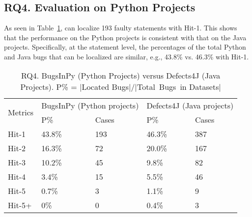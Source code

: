 \subsection{\bf RQ4. Evaluation on Python Projects}
As seen in Table~\ref{RQ4}, {\tool} can localize 193 faulty
statements with Hit-1. This shows that the
performance on the Python projects is consistent with that
on the Java projects. Specifically, at the statement level, the
percentages of the total Python and Java bugs that can be localized
are similar, e.g., 43.8\% vs. 46.3\% with Hit-1.



\begin{table}[t]
  \caption{RQ4. BugsInPy (Python Projects) versus Defects4J (Java Projects). P\% = $|$Located Bugs$|$/$|$Total~Bugs~in Datasets$|$}
  \tabcolsep 4.3pt
	\vspace{-10pt}
	{\small
		\begin{center}
			\tabcolsep 2.7pt
			\begin{tabular}{p{1.2cm}<{\centering}|p{1.55cm}<{\centering}p{1.55cm}<{\centering}|p{1.55cm}<{\centering}p{1.55cm}<{\centering}}\hline\cline{2-5}	
				
		\multirow{2}{*}{Metrics}& \multicolumn{2}{c|}{BugsInPy (Python projects)} & \multicolumn{2}{c}{Defects4J (Java projects)}\\\cline{2-5}
				           & P\%& Cases &P\%& Cases \\ \hline
				
				Hit-1  &  43.8\%  &   193    & 46.3\%  &387\\ 
				\hline
				  
			    Hit-2  &  16.3\%  &   72   & 20.0\%  &167\\
				\hline
				
				 
				Hit-3  &  10.2\%  &  45     & 9.8\%  &82\\
				\hline
				
				Hit-4  &  3.4\%  &   15    & 5.5\%  &46\\
				\hline
				
				Hit-5  & 0.7\%   &   3    & 1.1\%  &9\\
				\hline
				
				Hit-5+ &  0\%  &   0    & 0.4\%  &3\\
				\hline
			\end{tabular}
			\label{RQ4}
		\end{center}
	}
\end{table}



